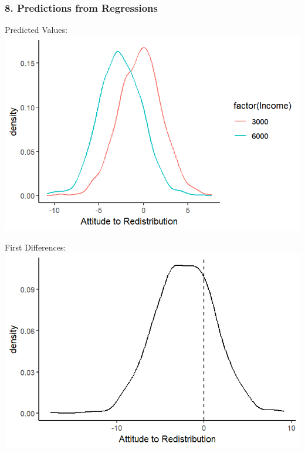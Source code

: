 \documentclass[xcolor=x11names,compress]{beamer}\usepackage[]{graphicx}\usepackage[]{color}
\makeatletter
\def\maxwidth{ %
  \ifdim\Gin@nat@width>\linewidth
    \linewidth
  \else
    \Gin@nat@width
  \fi
}
\newenvironment{knitrout}{}{} %
\renewcommand{\(}{\begin{columns}}
\renewcommand{\)}{\end{columns}}
\newcommand{\<}[1]{\begin{column}{#1}}
\renewcommand{\>}{\end{column}}
\makeatother
\begin{document}
\begin{frame}
\frametitle{8. Predictions from Regressions}
\begin{multicols}{2}
Predicted Values:
\begin{knitrout}
\color{fgcolor}
\includegraphics[width=\maxwidth]{figure/predictions2-1} 

\end{knitrout}
\columnbreak
First Differences:
\begin{knitrout}
\color{fgcolor}
\includegraphics[width=\maxwidth]{figure/predictions3-1} 

\end{knitrout}
\end{multicols}
\end{frame}
\end{document}
